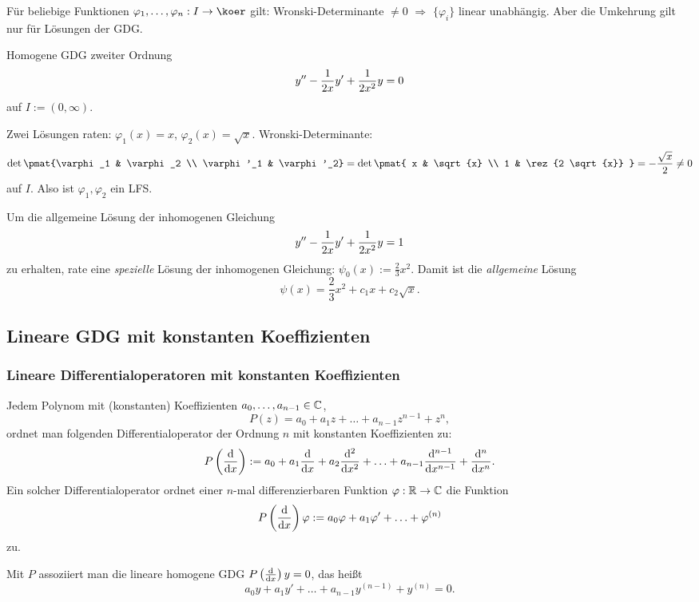   \begin{rmrk}
    Für beliebige Funktionen $\varphi_1, \ldots, \varphi_n:I \to \koer$ gilt:
    Wronski-Determinante $\ne 0$ $\Rightarrow$ $\{ \varphi_i \}$ linear
    unabhängig. Aber die Umkehrung gilt nur für Lösungen der GDG.
  \end{rmrk}

\begin{exmp}
  Homogene GDG zweiter Ordnung
  \[ y'' - \frac{1}{2x} y' + \frac{1}{2x^2}y = 0 \]
  auf $I := (0,\infty)$.

  Zwei Lösungen raten: $\varphi_1(x)=x$, $\varphi_2(x) = \sqrt{x}$.
  Wronski-Determinante:
  \[ \det \pmat{\varphi_1 & \varphi_2 \\ \varphi'_1 & \varphi'_2}
    = \det \pmat{ x & \sqrt{x} \\ 1  & \rez{2 \sqrt{x}} }
    = - \frac{\sqrt{x}}{2} \ne 0 \]
  auf $I$. Also ist $\varphi_1, \varphi_2$ ein LFS.

  Um die allgemeine Lösung der inhomogenen Gleichung
  \[ y'' -\frac{1}{2x} y' + \frac{1}{2x^2}y = 1 \]
  zu erhalten, rate eine \emph{spezielle} Lösung der inhomogenen Gleichung:
  $\psi_0(x) := \frac{2}{3} x^2$. Damit ist die \emph{allgemeine} Lösung
  \[ \psi(x) = \frac{2}{3} x^2 + c_1 x + c_2 \sqrt{x}. \]
\end{exmp}

\subsection{Lineare GDG mit konstanten Koeffizienten}

\subsubsection{Lineare Differentialoperatoren mit konstanten Koeffizienten}
Jedem Polynom mit (konstanten) Koeffizienten $a_0, \ldots, a_{n-1} \in
\mathbb{C}$,
\[ P(z) = a_0 + a_1 z + \ldots + a_{n-1}z^{n-1} + z^n,\]
ordnet man folgenden Differentialoperator der Ordnung $n$ mit konstanten
Koeffizienten zu:
\[ P \left( \frac{\mathrm{d} }{\mathrm{d} x} \right) := a_0 + a_1 \frac{\mathrm{d} }{\mathrm{d} x} + a_2
  \frac{\mathrm{d}^2}{\mathrm{d} x^2} + \ldots
  + a_{n-1} \frac{\mathrm{d}^{n-1}}{\mathrm{d} x^{n-1}}
  + \frac{\mathrm{d}^n}{\mathrm{d} x^n}. \]
Ein solcher Differentialoperator ordnet einer $n$-mal differenzierbaren Funktion
$\varphi: \mathbb{R} \to \mathbb{C}$ die Funktion
\[ P \left(  \frac{\mathrm{d} }{\mathrm{d} x} \right) \varphi := a_0 \varphi + a_1 \varphi' + \ldots
  + \varphi^{(n)} \]
zu.

Mit $P$ assoziiert man die lineare homogene GDG $P\left( \frac{\mathrm{d} }{\mathrm{d} x} \right) y =
0$, das heißt
\[ a_0 y + a_1 y' + \ldots + a_{n-1}y^{(n-1)} + y^{(n)} = 0. \]

